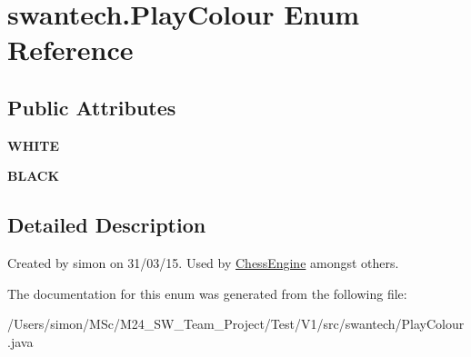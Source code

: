 \hypertarget{enumswantech_1_1_play_colour}{}\section{swantech.\+Play\+Colour Enum Reference}
\label{enumswantech_1_1_play_colour}
\subsection*{Public Attributes}
\begin{DoxyCompactItemize}
\item 
\hypertarget{enumswantech_1_1_play_colour_ad1f66414cb0f5de08aa973c29c695144}{}{\bfseries W\+H\+I\+T\+E}\label{enumswantech_1_1_play_colour_ad1f66414cb0f5de08aa973c29c695144}

\item 
\hypertarget{enumswantech_1_1_play_colour_ae0ea6d1df50fef598e3fecd90873ba35}{}{\bfseries B\+L\+A\+C\+K}\label{enumswantech_1_1_play_colour_ae0ea6d1df50fef598e3fecd90873ba35}

\end{DoxyCompactItemize}


\subsection{Detailed Description}
Created by simon on 31/03/15. Used by \hyperlink{classswantech_1_1_chess_engine}{Chess\+Engine} amongst others. 

The documentation for this enum was generated from the following file\+:\begin{DoxyCompactItemize}
\item 
/\+Users/simon/\+M\+Sc/\+M24\+\_\+\+S\+W\+\_\+\+Team\+\_\+\+Project/\+Test/\+V1/src/swantech/Play\+Colour.\+java\end{DoxyCompactItemize}
